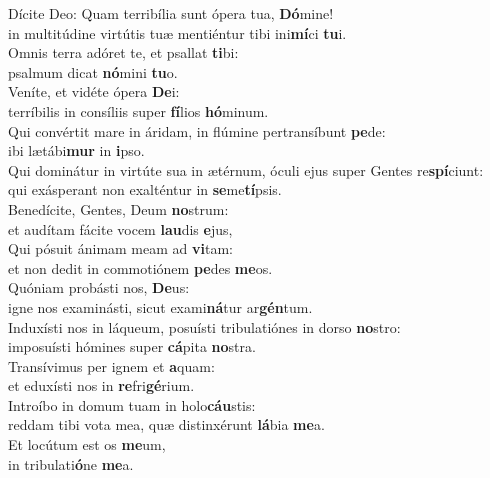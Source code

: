 \evenverse Dícite Deo: Quam terribília sunt ópera tua, \textbf{Dó}mine!~\*\\
\evenverse in multitúdine virtútis tuæ mentiéntur tibi ini\textbf{mí}ci \textbf{tu}i.\\
\oddverse Omnis terra adóret te, et psallat \textbf{ti}bi:~\*\\
\oddverse psalmum dicat \textbf{nó}mini \textbf{tu}o.\\
\evenverse Veníte, et vidéte ópera \textbf{De}i:~\*\\
\evenverse terríbilis in consíliis super \textbf{fí}lios \textbf{hó}minum.\\
\oddverse Qui convértit mare in áridam, in flúmine pertransíbunt \textbf{pe}de:~\*\\
\oddverse ibi lætábi\textbf{mur} in \textbf{i}pso.\\
\evenverse Qui dominátur in virtúte sua in ætérnum, óculi ejus super Gentes re\textbf{spí}ciunt:~\*\\
\evenverse qui exásperant non exalténtur in \textbf{se}me\textbf{tí}psis.\\
\oddverse Benedícite, Gentes, Deum \textbf{no}strum:~\*\\
\oddverse et audítam fácite vocem \textbf{lau}dis \textbf{e}jus,\\
\evenverse Qui pósuit ánimam meam ad \textbf{vi}tam:~\*\\
\evenverse et non dedit in commotiónem \textbf{pe}des \textbf{me}os.\\
\oddverse Quóniam probásti nos, \textbf{De}us:~\*\\
\oddverse igne nos examinásti, sicut exami\textbf{ná}tur ar\textbf{gén}tum.\\
\evenverse Induxísti nos in láqueum, posuísti tribulatiónes in dorso \textbf{no}stro:~\*\\
\evenverse imposuísti hómines super \textbf{cá}pita \textbf{no}stra.\\
\oddverse Transívimus per ignem et \textbf{a}quam:~\*\\
\oddverse et eduxísti nos in \textbf{re}fri\textbf{gé}rium.\\
\evenverse Introíbo in domum tuam in holo\textbf{cáu}stis:~\*\\
\evenverse reddam tibi vota mea, quæ distinxérunt \textbf{lá}bia \textbf{me}a.\\
\oddverse Et locútum est os \textbf{me}um,~\*\\
\oddverse in tribulati\textbf{ó}ne \textbf{me}a.\\
